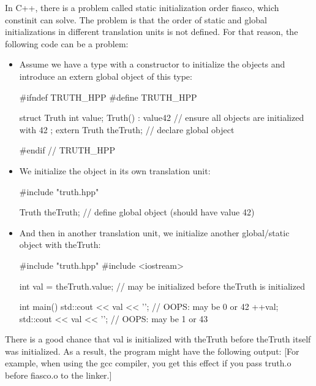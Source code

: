 In C++, there is a problem called static initialization order fiasco, which constinit can solve. The problem is that the order of static and global initializations in different translation units is not defined. For that reason, the following code can be a problem:

\begin{itemize}
\item 
Assume we have a type with a constructor to initialize the objects and introduce an extern global object of this type:


\begin{cpp}
#ifndef TRUTH_HPP
#define TRUTH_HPP

struct Truth {
	int value;
	Truth() : value{42} { // ensure all objects are initialized with 42
	}
};
extern Truth theTruth; // declare global object

#endif // TRUTH_HPP
\end{cpp}

\item
We initialize the object in its own translation unit:


\begin{cpp}
#include "truth.hpp"

Truth theTruth; // define global object (should have value 42)
\end{cpp}

\item
And then in another translation unit, we initialize another global/static object with theTruth:


\begin{cpp}
#include "truth.hpp"
#include <iostream>

int val = theTruth.value; // may be initialized before theTruth is initialized

int main()
{
	std::cout << val << '\n'; // OOPS: may be 0 or 42
	++val;
	std::cout << val << '\n'; // OOPS: may be 1 or 43
}
\end{cpp}
\end{itemize}

There is a good chance that val is initialized with theTruth before theTruth itself was initialized. As a result, the program might have the following output: [For example, when using the gcc compiler, you get this effect if you pass truth.o before fiasco.o to the linker.]

